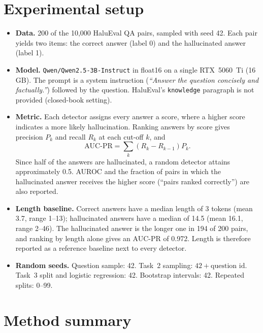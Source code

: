 \documentclass[11pt,a4paper]{article}
\begin{document}
\section{Experimental setup}\label{sec:data}

\begin{itemize}
  \item \textbf{Data.} 200 of the 10{,}000 HaluEval QA pairs, sampled with seed 42. Each pair
        yields two items: the correct answer (label 0) and the hallucinated answer (label 1).
  \item \textbf{Model.} \texttt{Qwen/Qwen2.5-3B-Instruct} in float16 on a single RTX~5060~Ti
        (16\,GB). The prompt is a system instruction (\emph{``Answer the question concisely and
        factually.''}) followed by the question. HaluEval's \texttt{knowledge} paragraph is not
        provided (closed-book setting).
  \item \textbf{Metric.} Each detector assigns every answer a score, where a higher score indicates
        a more likely hallucination. Ranking answers by score gives precision $P_k$ and recall
        $R_k$ at each cut-off $k$, and
        \begin{equation}
        \text{AUC-PR} = \sum_k \left(R_k - R_{k-1}\right) P_k .
        \end{equation}
        Since half of the answers are hallucinated, a random detector attains approximately 0.5.
        AUROC and the fraction of pairs in which the hallucinated answer receives the higher
        score (``pairs ranked correctly'') are also reported.
  \item \textbf{Length baseline.} Correct answers have a median length of 3 tokens (mean 3.7, range
        1--13); hallucinated answers have a median of 14.5 (mean 16.1, range 2--46). The
        hallucinated answer is the longer one in 194 of 200 pairs, and ranking by length alone
        gives an AUC-PR of 0.972. Length is therefore reported as a reference baseline next to
        every detector.
  \item \textbf{Random seeds.} Question sample: 42. Task~2 sampling: $42+\text{question id}$.
        Task~3 split and logistic regression: 42. Bootstrap intervals: 42. Repeated splits: 0--99.
\end{itemize}


\section{Method summary}\label{sec:method}
\end{document}
